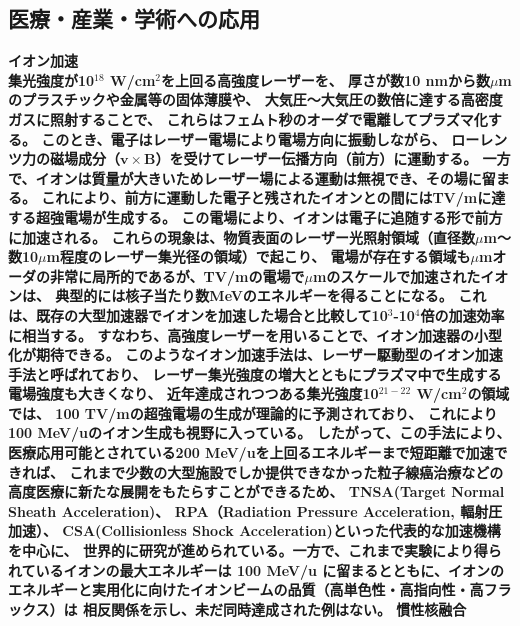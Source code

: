 \documentclass[a4paper,11pt,titlepage]{jsarticle}
\begin{document}
  \subsection{医療・産業・学術への応用}
  \bf{イオン加速}\\
  \rm
  集光強度が10$^{18}$ W/cm$^{2}$を上回る高強度レーザーを、
  厚さが数10 nmから数$\mu$mのプラスチックや金属等の固体薄膜や、
  大気圧～大気圧の数倍に達する高密度ガスに照射することで、
  これらはフェムト秒のオーダで電離してプラズマ化する。
  このとき、電子はレーザー電場により電場方向に振動しながら、
  ローレンツ力の磁場成分（$\bm{v} \times \bm{B}$）を受けてレーザー伝播方向（前方）に運動する。
  一方で、イオンは質量が大きいためレーザー場による運動は無視でき、その場に留まる。
  これにより、前方に運動した電子と残されたイオンとの間にはTV/mに達する超強電場が生成する。
  この電場により、イオンは電子に追随する形で前方に加速される。
  これらの現象は、物質表面のレーザー光照射領域（直径数$\mu$m～数10$\mu$m程度のレーザー集光径の領域）で起こり、
  電場が存在する領域も$\mu$mオーダの非常に局所的であるが、TV/mの電場で$\mu$mのスケールで加速されたイオンは、
  典型的には核子当たり数MeVのエネルギーを得ることになる。
  これは、既存の大型加速器でイオンを加速した場合と比較して10$^{3}$-10$^{4}$倍の加速効率に相当する。
  すなわち、高強度レーザーを用いることで、イオン加速器の小型化が期待できる。\cite{ft6}
  このようなイオン加速手法は、レーザー駆動型のイオン加速手法と呼ばれており、
  レーザー集光強度の増大とともにプラズマ中で生成する電場強度も大きくなり、
  近年達成されつつある集光強度10$^{21-22}$ W/cm$^{2}$の領域では、
  100 TV/mの超強電場の生成が理論的に予測されており、
  これにより100 MeV/uのイオン生成も視野に入っている。\cite{100Mev1,100Mev2,100Mev3}
  したがって、この手法により、医療応用可能とされている200 MeV/uを上回るエネルギーまで短距離で加速できれば、
  これまで少数の大型施設でしか提供できなかった粒子線癌治療などの高度医療に新たな展開をもたらすことができるため、
  TNSA(Target Normal Sheath Acceleration)、\cite{ClarkPRL2000,SnavelyPRL2000,WilksPoP2001,FushsNP2006,HegelichN2006,SchwoererN2006}
  RPA（Radiation Pressure Acceleration, 輻射圧加速）\cite{ft7,ft8,ft9}、
  CSA(Collisionless Shock Acceleration)といった代表的な加速機構\cite{SilvaPRL2004,HaberbergerNP2012,FiuzaPRL2012,FiuzaPoP2013,ZhangPoP2015,WangPoP2016,ChenSR2017,ZhangPRL2017}を中心に、
  世界的に研究が進められている。一方で、これまで実験により得られているイオンの最大エネルギーは
  100 MeV/u に留まるとともに、イオンのエネルギーと実用化に向けたイオンビームの品質（高単色性・高指向性・高フラックス）は
  相反関係を示し、未だ同時達成された例はない。 
  \bf{慣性核融合}\\
\end{document}
